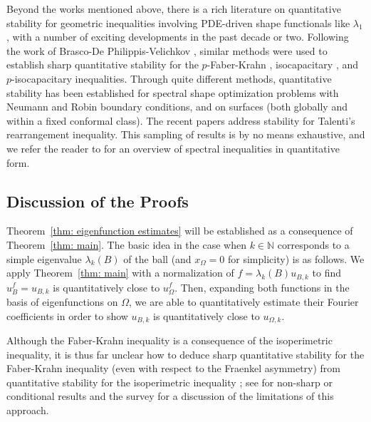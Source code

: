 \documentclass[10pt,a4paper]{amsart}
\numberwithin{equation}{section}
\def\W{\Omega}
\begin{document}
Beyond the works mentioned above, there is a rich literature on quantitative stability for geometric inequalities involving PDE-driven shape functionals like $\lambda_1$, with a number of exciting developments in the past decade or two. 
Following the work of Brasco-De Philippis-Velichkov \cite{BDV15}, similar methods were used to establish sharp quantitative stability for the $p$-Faber-Krahn \cite{FuscoZhang}, isocapacitary  \cite{DPMMCapacity}, and $p$-isocapacitary \cite{Mukoseeva+2021} inequalities.
Through quite different methods, quantitative stability has been established for spectral shape optimization problems with Neumann \cite{BrascoPratelli} and Robin \cite{BucurRobinLaplacian} boundary conditions, and on surfaces \cite{MR4859580} (both globally and within a fixed conformal class). The recent papers \cite{acampora2025sharpquantitativetalentisinequality, amato2024talenticomparisonresultquantitative} address stability for Talenti's rearrangement inequality. This sampling of results is by no means exhaustive, and we refer the reader to \cite{BrascoDePSurvey} for an overview of spectral inequalities in quantitative form.




\subsection*{Discussion of the Proofs}
Theorem~\ref{thm: eigenfunction estimates} will be established as a consequence of Theorem~\ref{thm: main}. The basic idea in the case when $k\in \mathbb{N}$ corresponds to a simple eigenvalue $\lambda_k(B)$ of the ball (and $x_\W = 0$ for simplicity) is as follows. We apply Theorem~\ref{thm: main} with a normalization of $f = \lambda_k(B) u_{B,k}$ to find $u_B^f = u_{B, k}$ is quantitatively close to $u_\W^f$. Then, expanding both functions in the basis of eigenfunctions on $\W$, we are able to quantitatively estimate their Fourier coefficients in order to show $u_{B,k}$ is quantitatively close to $u_{\W ,k}$.

Although the Faber-Krahn inequality is a consequence of the isoperimetric inequality, it is thus far unclear how to deduce sharp quantitative stability for the Faber-Krahn inequality (even with respect to the Fraenkel asymmetry) from quantitative stability for the isoperimetric inequality \cite{FuMaPr, FiMaPr, CiLe12}; see \cite{Melas, HansenNadir94, FMP09} for non-sharp or conditional results and the survey \cite{BrascoDePSurvey} for a discussion of the limitations of this approach.
\end{document}
